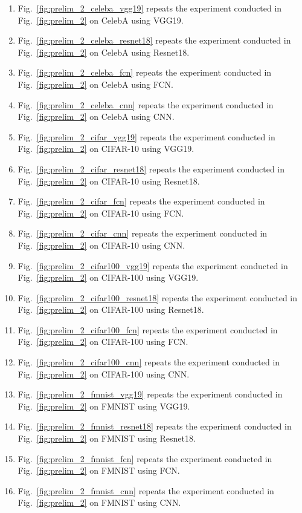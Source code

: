 \begin{enumerate}[leftmargin=5mm]
    \item Fig.~\ref{fig:prelim_2_celeba_vgg19} repeats the experiment conducted in Fig.~\ref{fig:prelim_2} on CelebA using VGG19.
    \item Fig.~\ref{fig:prelim_2_celeba_resnet18} repeats the experiment conducted in Fig.~\ref{fig:prelim_2} on CelebA using Resnet18.
    \item Fig.~\ref{fig:prelim_2_celeba_fcn} repeats the experiment conducted in Fig.~\ref{fig:prelim_2} on CelebA using FCN.
    \item Fig.~\ref{fig:prelim_2_celeba_cnn} repeats the experiment conducted in Fig.~\ref{fig:prelim_2} on CelebA using CNN.
    
    \item Fig.~\ref{fig:prelim_2_cifar_vgg19} repeats the experiment conducted in Fig.~\ref{fig:prelim_2} on CIFAR-10 using VGG19.
    \item Fig.~\ref{fig:prelim_2_cifar_resnet18} repeats the experiment conducted in Fig.~\ref{fig:prelim_2} on CIFAR-10 using Resnet18.
    \item Fig.~\ref{fig:prelim_2_cifar_fcn} repeats the experiment conducted in Fig.~\ref{fig:prelim_2} on CIFAR-10 using FCN.
    \item Fig.~\ref{fig:prelim_2_cifar_cnn} repeats the experiment conducted in Fig.~\ref{fig:prelim_2} on CIFAR-10 using CNN.
    
    \item Fig.~\ref{fig:prelim_2_cifar100_vgg19} repeats the experiment conducted in Fig.~\ref{fig:prelim_2} on CIFAR-100 using VGG19.
    \item Fig.~\ref{fig:prelim_2_cifar100_resnet18} repeats the experiment conducted in Fig.~\ref{fig:prelim_2} on CIFAR-100 using Resnet18.
    \item Fig.~\ref{fig:prelim_2_cifar100_fcn} repeats the experiment conducted in Fig.~\ref{fig:prelim_2} on CIFAR-100 using FCN.
    \item Fig.~\ref{fig:prelim_2_cifar100_cnn} repeats the experiment conducted in Fig.~\ref{fig:prelim_2} on CIFAR-100 using CNN.
    
    \item Fig.~\ref{fig:prelim_2_fmnist_vgg19} repeats the experiment conducted in Fig.~\ref{fig:prelim_2} on FMNIST using VGG19.
    \item Fig.~\ref{fig:prelim_2_fmnist_resnet18} repeats the experiment conducted in Fig.~\ref{fig:prelim_2} on FMNIST using Resnet18.
    \item Fig.~\ref{fig:prelim_2_fmnist_fcn} repeats the experiment conducted in Fig.~\ref{fig:prelim_2} on FMNIST using FCN.
    \item Fig.~\ref{fig:prelim_2_fmnist_cnn} repeats the experiment conducted in Fig.~\ref{fig:prelim_2} on FMNIST using CNN.
    

\end{enumerate}
